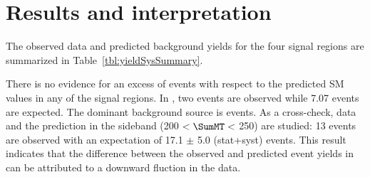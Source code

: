 \section{Results and interpretation}
\label{sect:stat}
The observed data and predicted background yields for the four signal regions are summarized in Table~\ref{tbl:yieldSysSummary}. 

There is no evidence for an excess of events with respect to the predicted SM values in any of the signal regions. In \bintwo, two events are observed while 7.07 events are expected. The dominant background source is \wjets events. As a cross-check, data and the prediction in the sideband (200 $< \SumMT <$ 250\GeV) are studied: 13 events are observed with an expectation of 17.1 $\pm$ 5.0 (stat+syst) events. 
This result indicates that the difference between the observed and predicted event yields in \bintwo can be attributed to a downward fluction in the data.

